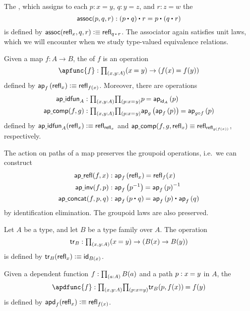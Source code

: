The , which assigns to each $p:x=y$, $q:y=z$, and $r:z=w$ the 
\begin{equation*}
\mathsf{assoc}(p,q,r) : \ct{(\ct{p}{q})}{r}=\ct{p}{(\ct{q}{r})}
\end{equation*}
is defined by $\mathsf{assoc}(\refl{x},q,r)\defeq \refl{\ct{q}{r}}$. The associator again satisfies unit laws, which we will encounter when we study type-valued equivalence relations.

Given a map $f:A\to B$, the  of $f$ is an operation
\begin{equation*}
\apfunc{f} : \prd{x,y:A} (\id{x}{y})\to(\id{f(x)}{f(y)})
\end{equation*}
defined by $\ap{f}{\refl{x}}\defeq\refl{f(x)}$. 
Moreover, there are operations
\begin{align*}
\mathsf{ap\usc{}idfun}_A & : \prd{x,y:A}{p:\id{x}{y}} \id{p}{\ap{\idfunc[A]}{p}} \\
\mathsf{ap\usc{}comp}(f,g) & : \prd{x,y:A}{p:\id{x}{y}} \id{\ap{g}{\ap{f}{p}}}{\ap{g\circ f}{p}}
\end{align*}
defined by $\mathsf{ap\usc{}idfun}_A(\refl{x})\defeq \refl{\refl{x}}$ and $\mathsf{ap\usc{}comp}(f,g,\refl{x})\jdeq \refl{\refl{g(f(x))}}$, respectively.

The action on paths of a map preserves the groupoid operations, i.e.~we can construct
\begin{align*}
\mathsf{ap\usc{}refl}(f,x) & : \id{\ap{f}{\refl{x}}}{\refl{f}(x)} \\
\mathsf{ap\usc{}inv}(f,p) & : \id{\ap{f}{p^{-1}}}{\ap{f}{p}^{-1}} \\
\mathsf{ap\usc{}concat}(f,p,q) & : \id{\ap{f}{\ct{p}{q}}}{\ct{\ap{f}{p}}{\ap{f}{q}}}
\end{align*}
by identification elimination. The groupoid laws are also preserved.

\begin{defn}
Let $A$ be a type, and let $B$ be a type family over $A$. The  operation
\begin{equation*}
\mathsf{tr}_B:\prd{x,y:A} (\id{x}{y})\to (B(x)\to B(y))
\end{equation*}
is defined by $\mathsf{tr}_B(\refl{x}) \defeq \idfunc[B(x)]$. 
\end{defn}

\begin{defn}\label{defn:apd}
Given a dependent function $f:\prd{a:A}B(a)$ and a path $p:\id{x}{y}$ in $A$, the 
\begin{equation*}
\apdfunc{f} : \prd{x,y:A}{p:x=y}\id{\mathsf{tr}_B(p,f(x))}{f(y)}
\end{equation*}
is defined by $\apd{f}{\refl{x}}\defeq \refl{f(x)}$.
\end{defn}

